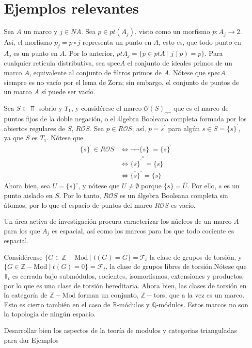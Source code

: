 \chapter{Ejemplos relevantes}
Sea $A$ un marco y $j\in NA$. Sea $p\in pt(A_j)$, visto como un morfismo $p:A_j\to 2$. Así, el morfismo $p_j=p\circ j$ representa un punto en $A$, esto es, que todo punto en $A_j$ es un punto en $A$. Por lo anterior, $ptA_j=\{p\in ptA \mid j(p)=p\}$.
 Para cualquier retícula distributiva, sea spec$A$ el conjunto de ideales primos de un marco $A$, equivalente al conjunto de filtros primos de $A$. Nótese que spec$A$ siempre es no vacío por el lema de Zorn; sin embargo, el conjunto de puntos de un marco $A$ sí puede ser vacío.
 
 \begin{exa}
     Sea $S\in \Top$ sobrio y $T_1$, y considérese el marco $\mathcal{O}(S)_{\neg \neg}$ que es el marco de puntos fijos de la doble negación, o el álgebra Booleana completa formada por los abiertos regulares de $S$, $R\mathcal{O}S$.
     Sea $p\in R\mathcal{O}S$; así, $p=\overline{s}^{\prime}$ para algún $s\in S=\{s\}^{\prime}$, ya que $S$ es $T_1$. Nótese que \begin{align*}
         \{s\}^{\prime}\in R\mathcal{O}S&\iff \neg\neg \{s\}^\prime =\{s\}^\prime\\
         &\iff \overline{\{s\}^\prime}^\circ=\{s\}^\prime\\
         &\iff \overline{\{s\}}^\circ=\{s\}
     \end{align*}
Ahora bien, sea $U=\{s\}^\circ$, y nótese que $U\neq\emptyset$ porque $\{s\}=\overline{U}$. Por ello, $s$ es un punto aislado en $S$.  Por lo tanto, $R\mathcal{O}S$ es un álgebra Booleana completa sin átomos, por lo que el espacio de puntos del marco $R\mathcal{O}S$ es vacío.
 \end{exa}
 Un área activa de investigación procura caracterizar los núcleos de un marco $A$ para los que $A_j$ es espacial, así como los marcos para los que todo cociente es espacial.
 
 \begin{exa}
 Considérense $\{G\in \mathbb{Z}-\text{Mod} \mid t(G)=G\}=\mathscr{T}_t$ la clase de grupos de torsión, y $\{G\in\mathbb{Z}-\text{Mod}\mid t(G)=0\}=\mathscr{F}_t$, la clase de grupos libres de torsión.Nótese que $\mathbb{T}_t$ es cerrada bajo submódulos, cocientes, isomorfismos, extensiones y productos, por lo que es una clase de torsión hereditaria.
 Ahora bien, las clases de torsión en la categoría de $\mathbb{Z}-\text{Mod}$ forman un conjunto, $\mathbb{Z}-$tors, que a la vez es un marco. Esto es cierto también en el caso de $\mathbb{R}$-módulos y $\mathbb{Q}$-módulos.
 Estos marcos no son la topología de ningún espacio.
 \end{exa}

Desarrollar bien los aspectos de la teoría de modulos y categorias trianguladas para dar Ejemplos
